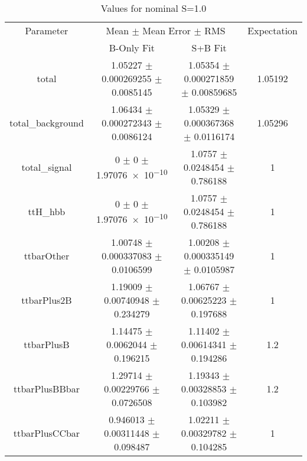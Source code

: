 \begin{table}
\centering
\caption{Values for nominal S=1.0}
\begin{tabular}{cccc}
\toprule
Parameter & \multicolumn{2}{c}{Mean $\pm$ Mean Error $\pm$ RMS} & Expectation\\
 & B-Only Fit & S+B Fit & \\
\midrule
total & \num{1.05227} $\pm$ \num{0.000269255} $\pm$ \num{0.0085145} & \num{1.05354} $\pm$ \num{0.000271859} $\pm$ \num{0.00859685} & \num{1.05192}\\
total\_background & \num{1.06434} $\pm$ \num{0.000272343} $\pm$ \num{0.0086124} & \num{1.05329} $\pm$ \num{0.000367368} $\pm$ \num{0.0116174} & \num{1.05296}\\
total\_signal & \num{0} $\pm$ \num{0} $\pm$ \num{1.97076e-10} & \num{1.0757} $\pm$ \num{0.0248454} $\pm$ \num{0.786188} & \num{1}\\
ttH\_hbb & \num{0} $\pm$ \num{0} $\pm$ \num{1.97076e-10} & \num{1.0757} $\pm$ \num{0.0248454} $\pm$ \num{0.786188} & \num{1}\\
ttbarOther & \num{1.00748} $\pm$ \num{0.000337083} $\pm$ \num{0.0106599} & \num{1.00208} $\pm$ \num{0.000335149} $\pm$ \num{0.0105987} & \num{1}\\
ttbarPlus2B & \num{1.19009} $\pm$ \num{0.00740948} $\pm$ \num{0.234279} & \num{1.06767} $\pm$ \num{0.00625223} $\pm$ \num{0.197688} & \num{1}\\
ttbarPlusB & \num{1.14475} $\pm$ \num{0.0062044} $\pm$ \num{0.196215} & \num{1.11402} $\pm$ \num{0.00614341} $\pm$ \num{0.194286} & \num{1.2}\\
ttbarPlusBBbar & \num{1.29714} $\pm$ \num{0.00229766} $\pm$ \num{0.0726508} & \num{1.19343} $\pm$ \num{0.00328853} $\pm$ \num{0.103982} & \num{1.2}\\
ttbarPlusCCbar & \num{0.946013} $\pm$ \num{0.00311448} $\pm$ \num{0.098487} & \num{1.02211} $\pm$ \num{0.00329782} $\pm$ \num{0.104285} & \num{1}\\
\bottomrule
\end{tabular}
\end{table}